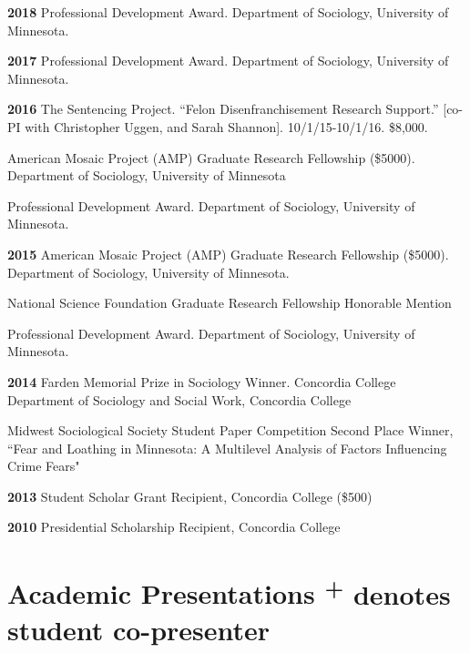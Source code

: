 \documentclass[letterpaper]{article}
\newenvironment{publist}{%
  \begin{list}{}{%
    \setlength{\leftmargin}{0cm}   %
    \setlength{\labelwidth}{2cm}     %
    \setlength{\labelsep}{0.5cm}     %
  }%
}{%
  \end{list}%
}
\begin{document}
\begin{publist}
\item[\textbf{2018}] Professional Development Award. Department of Sociology, University of Minnesota. 
\item[\textbf{2017}] Professional Development Award. Department of Sociology, University of Minnesota. 
\item[\textbf{2016}] The Sentencing Project. “Felon Disenfranchisement Research Support.” [co-PI with Christopher Uggen, and Sarah Shannon]. 10/1/15-10/1/16. \$8,000.
\item American Mosaic Project (AMP) Graduate Research Fellowship (\$5000). Department of Sociology, University of Minnesota
\item Professional Development Award. Department of Sociology, University of Minnesota. 
\item[\textbf{2015}] American Mosaic Project (AMP) Graduate Research Fellowship (\$5000). Department of Sociology, University of Minnesota. 
\item National Science Foundation Graduate Research Fellowship Honorable Mention
\item Professional Development Award. Department of Sociology, University of Minnesota. 
\item[\textbf{2014}]Farden Memorial Prize in Sociology Winner. Concordia College Department of Sociology and Social Work, Concordia College
\item Midwest Sociological Society Student Paper Competition Second Place Winner,  ``Fear and Loathing in Minnesota: A Multilevel Analysis of Factors Influencing Crime Fears"
\item[\textbf{2013}] Student Scholar Grant Recipient, Concordia College (\$500)
\item[\textbf{2010}] Presidential Scholarship Recipient, Concordia College

\end{publist}



\section*{\textbf{Academic Presentations} \scriptsize{\textsuperscript{+} denotes student co-presenter}} 
\end{document}
